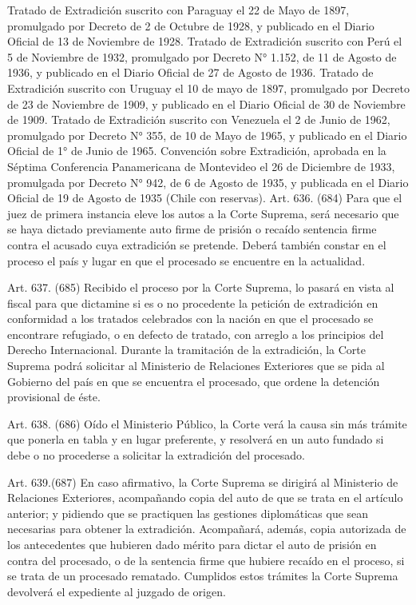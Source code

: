     Tratado de Extradición suscrito con Paraguay el 22 de Mayo de 1897, promulgado por Decreto de 2 de Octubre de 1928, y publicado en el Diario Oficial de 13 de Noviembre de 1928.
    Tratado de Extradición suscrito con Perú el 5 de Noviembre de 1932, promulgado por Decreto N° 1.152, de 11 de Agosto de 1936, y publicado en el Diario Oficial de 27 de Agosto de 1936.
    Tratado de Extradición suscrito con Uruguay el 10 de mayo de 1897, promulgado por Decreto de 23 de Noviembre de 1909, y publicado en el Diario Oficial de 30 de Noviembre de 1909.
    Tratado de Extradición suscrito con Venezuela el 2 de Junio de 1962, promulgado por Decreto N° 355, de 10 de Mayo de 1965, y publicado en el Diario Oficial de 1° de Junio de 1965.
    Convención sobre Extradición, aprobada en la Séptima Conferencia Panamericana de Montevideo el 26 de Diciembre de 1933, promulgada por Decreto N° 942, de 6 de Agosto de 1935, y publicada en el Diario Oficial de 19 de Agosto de 1935 (Chile con reservas).
    Art. 636. (684) Para que el juez de primera instancia eleve los autos a la Corte Suprema, será necesario que se haya dictado previamente auto firme de prisión o recaído sentencia firme contra el acusado cuya extradición se pretende.
    Deberá también constar en el proceso el país y lugar en que el procesado se encuentre en la actualidad.


    Art. 637. (685) Recibido el proceso por la Corte Suprema, lo pasará en vista al fiscal para que dictamine si es o no procedente la petición de extradición en conformidad a los tratados celebrados con la nación en que el procesado se encontrare refugiado, o en defecto de tratado, con arreglo a los principios del Derecho Internacional.
    Durante la tramitación de la extradición, la Corte Suprema podrá solicitar al Ministerio de Relaciones Exteriores que se pida al Gobierno del país en que se encuentra el procesado, que ordene la detención provisional de éste.


    Art. 638. (686) Oído el Ministerio Público, la Corte verá la causa sin más trámite que ponerla en tabla y en lugar preferente, y resolverá en un auto fundado si debe o no procederse a solicitar la extradición del procesado.


    Art. 639.(687) En caso afirmativo, la Corte Suprema se dirigirá al Ministerio de Relaciones Exteriores, acompañando copia del auto de que se trata en el artículo anterior; y pidiendo que se practiquen las gestiones diplomáticas que sean necesarias para obtener la extradición.
    Acompañará, además, copia autorizada de los antecedentes que hubieren dado mérito para dictar el auto de prisión en contra del procesado, o de la sentencia firme que hubiere recaído en el proceso, si se trata de un procesado rematado.
    Cumplidos estos trámites la Corte Suprema devolverá el expediente al juzgado de origen.



